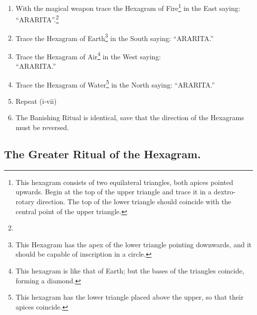 \begin{enumerate}[label=(\textit{\Roman*})]
\item With the magical weapon trace the Hexagram of Fire\footnote{This hexagram consists of two equilateral triangles, both apices pointed upwards. Begin at the top of the upper triangle and trace it in a dextro-rotary direction. The top of the lower triangle should coincide with the central point of the upper triangle.} in the East saying: \enquote{ARARITA}.\footnote{\footnotemark}
\item Trace the Hexagram of Earth\footnote{This Hexagram has the apex of the lower triangle pointing downwards, and it should be capable of inscription in a circle.} in the South saying: \enquote{ARARITA.}
\item Trace the Hexagram of Air\footnote{This hexagram is like that of Earth; but the bases of the triangles coincide, forming a diamond.} in the West saying: \\ \enquote{ARARITA.}
\item Trace the Hexagram of Water\footnote{This hexagram has the lower triangle placed above the upper, so that their apices coincide.} in the North saying: \enquote{ARARITA.}
\item Repeat (i-vii)
\item[] The Banishing Ritual is identical, save that the direction of the Hexagrams must be reversed.
\end{enumerate}

\subsection*{The Greater Ritual of the Hexagram.}
\begin{center}
\end{center}

